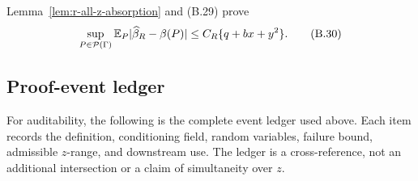Lemma~\ref{lem:r-all-z-absorption} and (B.29) prove
\begin{equation}
 \sup_{P\in\mathcal P(\Gamma)}
 \mathbb E_P\lvert \widehat\beta_R-\beta(P)\rvert
 \le C_R\{q+bx+y^2\}.
 \tag{B.30}
\end{equation}

\subsection{Proof-event ledger}
\label{app:upper-event-ledger}

For auditability, the following is the complete event ledger used above.
Each item records the definition, conditioning field, random variables,
failure bound, admissible \(z\)-range, and downstream use.  The ledger is a
cross-reference, not an additional intersection or a claim of simultaneity
over \(z\).

